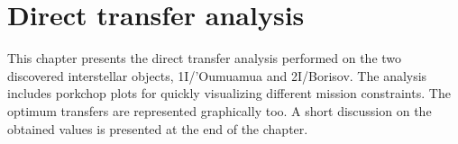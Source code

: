 \chapter{Direct transfer analysis}

This chapter presents the direct transfer analysis performed on the two
discovered interstellar objects, 1I/'Oumuamua and 2I/Borisov. The analysis
includes porkchop plots for quickly visualizing different mission constraints.
The optimum transfers are represented graphically too. A short discussion on the
obtained values is presented at the end of the chapter.


